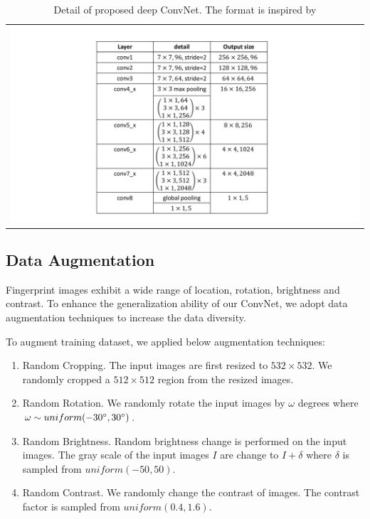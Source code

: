\begin{table}[!ht]
	\centering
	\caption{Detail of proposed deep ConvNet. The format is inspired by \cite{he2016deep}}
	\label{tab.cnn_params}
	\begin{tabular}{l}
		\includegraphics[scale=0.45,clip=true,trim = 78mm 5mm 70mm 5mm]{fig/figs/cnn_table.pdf}
	\end{tabular}
\end{table}

\subsection{Data Augmentation}
\label{sec-dataAug}
Fingerprint images exhibit a wide range of location, rotation, brightness and contrast. To enhance the generalization ability of our ConvNet, we adopt data augmentation techniques to increase the data diversity.
	
To augment training dataset, we applied below augmentation techniques:

\begin{enumerate}

	\item Random Cropping. The input images are first resized to $532 \times 532$. We randomly cropped a $512\times512$ region from the resized images.
	\item Random Rotation. We randomly rotate the input images by $\omega$ degrees where $\omega \sim uniform (-30\degree, 30\degree)$.
	\item Random Brightness.  Random brightness change is performed on the input images. The gray scale of the input images $I$ are change to $I + \delta$ where $\delta$ is  sampled from $uniform (-50, 50)$.
	\item Random Contrast. We randomly change the contrast of images. The contrast factor is sampled from $uniform (0.4, 1.6)$.

\end{enumerate}

